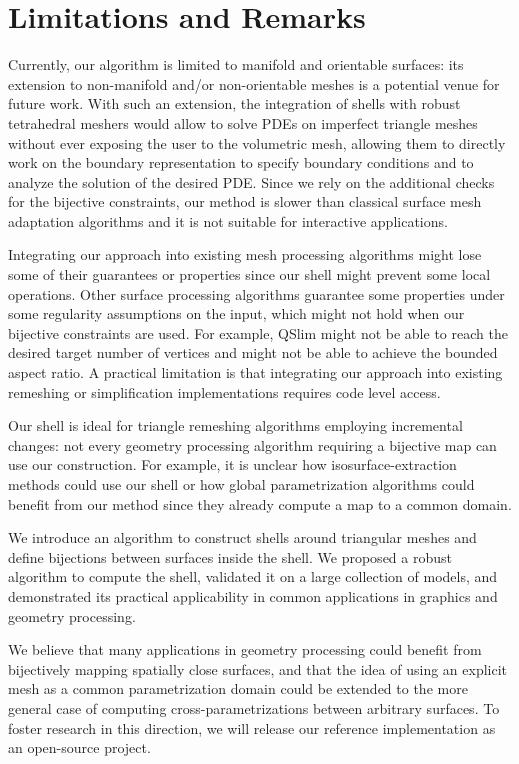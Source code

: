 \section{Limitations and Remarks}

Currently, our algorithm is limited to manifold and orientable surfaces: its extension to non-manifold and/or non-orientable meshes is a potential venue for future work. With such an extension, the integration of shells with robust tetrahedral meshers  would allow to solve PDEs on imperfect triangle meshes without ever exposing the user to the volumetric mesh, allowing them to directly work on the boundary representation to specify boundary conditions and to analyze the solution of the desired PDE.
%
{Since we rely on the additional checks for the bijective constraints, our method is slower than classical surface mesh adaptation algorithms and it is not suitable for interactive applications.}

{Integrating our approach into existing mesh processing algorithms might lose some of their guarantees or properties since our shell might prevent some local operations.
Other surface processing algorithms guarantee some properties under some regularity assumptions on the input, which might not hold when our bijective constraints are used. 
For example, 
QSlim \cite{garland1997surface} might not be able to reach the desired target number of vertices and \cite{dey2010polygonal} might not be able to achieve the bounded aspect ratio.}
{A practical limitation is that integrating our approach into existing remeshing or simplification implementations requires code level access.}

{Our shell is ideal for triangle remeshing algorithms employing incremental changes: not every geometry processing algorithm requiring a bijective map can use our construction. For example, it is unclear how isosurface-extraction methods \cite{hass2020approximating} could use our shell or how global parametrization algorithms \cite{kraevoy2004cross,Schreiner:2004,alliez2003isotropic,bommes2013quad} could benefit from our method since they already compute a map to a common domain.}



We introduce an algorithm to construct shells around triangular {meshes} and define bijections between surfaces inside the shell. We proposed a robust algorithm to compute the shell,
validated it on a large collection of models, and demonstrated its practical applicability in common applications in graphics and geometry processing. 


We believe that many applications in geometry processing could benefit from bijectively mapping spatially close surfaces, and that the idea of using an explicit mesh as a common parametrization domain could be extended to the more general case of computing cross-parametrizations between arbitrary surfaces. To foster research in this direction, we will release our reference implementation as an open-source project.



